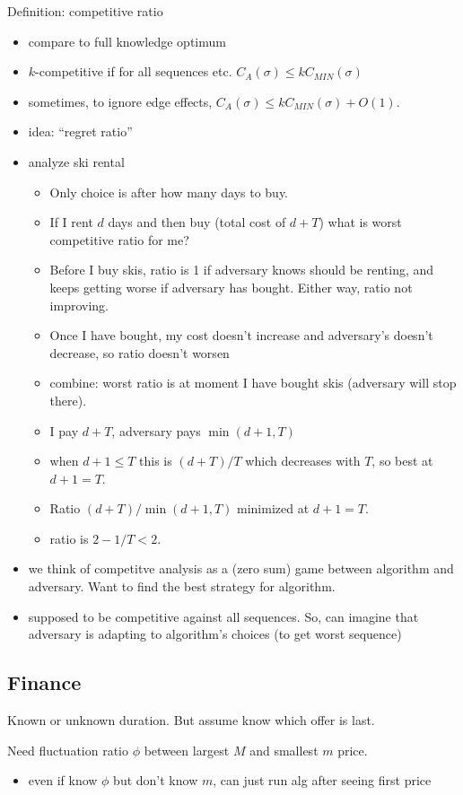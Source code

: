 \documentclass{article}
\begin{document}
Definition: competitive ratio
\begin{itemize}
\item compare to full knowledge optimum
\item $k$-competitive if for all sequences etc. $C_A(\sigma) \le
  kC_{MIN}(\sigma)$ 
\item sometimes, to ignore edge effects, $C_A(\sigma) \le
  kC_{MIN}(\sigma)+ O(1)$.
\item idea: ``regret ratio''
\item analyze ski rental
\begin{itemize}
\item Only choice is after how many days to buy.
\item If I rent $d$ days and then buy (total cost of $d+T$) what is worst
  competitive ratio for me?
\item Before I buy skis, ratio is 1 if adversary knows should be renting, and
  keeps getting worse if adversary has bought.  Either way, ratio not
  improving. 
\item Once I have bought, my cost doesn't increase and adversary's
  doesn't decrease, so ratio doesn't worsen
\item combine: worst ratio is at moment I have bought skis (adversary
  will stop there).
\item I pay $d+T$, adversary pays $\min(d+1,T)$
\item when $d+1 \le T$ this is $(d+T)/T$ which decreases with $T$, so
  best at $d+1=T$.
\item Ratio $(d+T)/\min(d+1,T)$ minimized at $d+1=T$.   
\item ratio is $2-1/T<2$.
\end{itemize}
\item we think of competitve analysis as a (zero sum) game between
  algorithm and adversary.  Want to find the best strategy for algorithm.
\item supposed to be competitive against all sequences. So, can
  imagine that adversary is adapting to algorithm's choices (to get
  worst sequence)
\end{itemize}

\subsection{Finance}

Known or unknown duration.  But assume know which offer is last.

Need fluctuation ratio $\phi$ between largest $M$ and smallest $m$ price.
\begin{itemize}
\item even if know $\phi$ but don't know $m$, can just run alg
  after seeing first price
\end{itemize}
\end{document}
